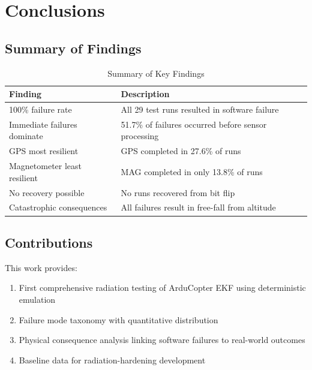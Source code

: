 \documentclass[11pt,a4paper]{article}
\begin{document}
\section{Conclusions}

\subsection{Summary of Findings}

\begin{table}[H]
\centering
\caption{Summary of Key Findings}
\label{tab:findings}
\begin{tabular}{@{}lp{9cm}@{}}
\toprule
\textbf{Finding} & \textbf{Description} \\
\midrule
100\% failure rate & All 29 test runs resulted in software failure \\
Immediate failures dominate & 51.7\% of failures occurred before sensor processing \\
GPS most resilient & GPS completed in 27.6\% of runs \\
Magnetometer least resilient & MAG completed in only 13.8\% of runs \\
No recovery possible & No runs recovered from bit flip \\
Catastrophic consequences & All failures result in free-fall from altitude \\
\bottomrule
\end{tabular}
\end{table}

\subsection{Contributions}

This work provides:

\begin{enumerate}
  \item First comprehensive radiation testing of ArduCopter EKF using deterministic emulation
  \item Failure mode taxonomy with quantitative distribution
  \item Physical consequence analysis linking software failures to real-world outcomes
  \item Baseline data for radiation-hardening development
\end{enumerate}
\end{document}
